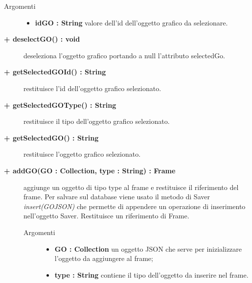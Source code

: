 \begin{description}
\begin{description}
\begin{description}
\begin{description}
			\item[Argomenti] \hfill
				\begin{itemize}
						\item \textbf{idGO : String			} \hfill
							valore dell'id dell'oggetto grafico da selezionare.  				
				\end{itemize}

\end{description}

\end{description}

\begin{description}
		\item[\textbf{\color{blue}+ deselectGO() : void			}] \hfill
			deseleziona l'oggetto grafico portando a null l'attributo selectedGo. 
\end{description}

\begin{description}
		\item[\textbf{\color{blue}+ getSelectedGOId() : String			}] \hfill
			restituisce l'id dell'oggetto grafico selezionato.
\end{description}

\begin{description}
		\item[\textbf{\color{blue}+ getSelectedGOType() : String			}] \hfill
			restituisce il tipo dell'oggetto grafico selezionato.
\end{description}

\begin{description}
		\item[\textbf{\color{blue}+ getSelectedGO() : String			}] \hfill
			restituisce l'oggetto grafico selezionato.
\end{description}

\begin{description}
		\item[\textbf{\color{blue}+ addGO(GO : Collection, type : String) : Frame			}] \hfill
			aggiunge un oggetto di tipo type al frame e restituisce il riferimento del frame. Per  salvare sul database viene usato il metodo di Saver \textit{insert(GOJSON)} che permette di appendere un operazione di inserimento nell'oggetto Saver. Restituisce un riferimento di Frame.  

\begin{description}
			\item[Argomenti] \hfill
				\begin{itemize}
						\item \textbf{GO : Collection			} \hfill
					un oggetto JSON che serve per inizializzare l'oggetto da aggiungere al frame;
					  	\item \textbf{type : String			} \hfill
					  	contiene il tipo dell'oggetto da inserire nel frame.
				\end{itemize}


\end{description}
\end{description}
\end{description}
\end{description}
